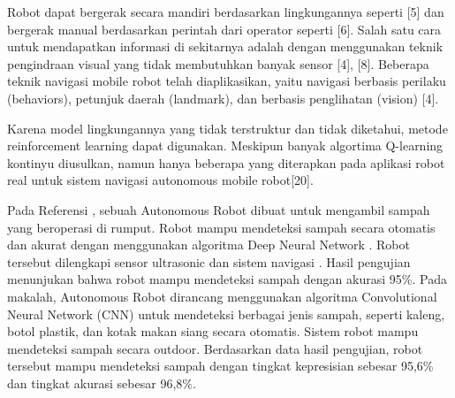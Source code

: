  Robot dapat bergerak secara mandiri berdasarkan lingkungannya seperti [5] dan bergerak manual berdasarkan perintah dari operator seperti [6]. 
 Salah satu cara untuk mendapatkan informasi di sekitarnya adalah dengan menggunakan teknik pengindraan visual yang tidak membutuhkan banyak sensor [4], [8].
 Beberapa teknik navigasi mobile robot telah diaplikasikan, yaitu navigasi berbasis perilaku (behaviors), petunjuk daerah (landmark), dan berbasis penglihatan (vision) [4]. 
 
 
 
 Karena model lingkungannya yang tidak terstruktur dan tidak diketahui, metode reinforcement learning dapat digunakan.  Meskipun banyak algortima Q-learning kontinyu diusulkan, namun hanya beberapa yang diterapkan pada aplikasi robot real untuk sistem navigasi autonomous mobile robot[20]. 
 

 
 Pada Referensi \cite{Bai2018}, sebuah Autonomous Robot dibuat untuk mengambil sampah yang beroperasi di rumput. Robot mampu mendeteksi sampah secara otomatis dan akurat dengan menggunakan algoritma Deep Neural Network \cite{Kong2009}. Robot tersebut dilengkapi sensor ultrasonic\cite{Michael2008} dan sistem navigasi \cite{Wang2008}. Hasil pengujian menunjukan bahwa robot mampu mendeteksi sampah dengan akurasi 95\%. Pada makalah\cite{Arai2019}, Autonomous Robot dirancang menggunakan algoritma Convolutional Neural Network (CNN) untuk mendeteksi berbagai jenis sampah, seperti kaleng, botol plastik, dan kotak makan siang secara otomatis. Sistem robot mampu mendeteksi sampah secara outdoor. Berdasarkan data hasil pengujian\cite{Arai2019}, robot tersebut mampu mendeteksi sampah dengan tingkat kepresisian sebesar 95,6\% dan tingkat akurasi sebesar 96,8\%.
 
